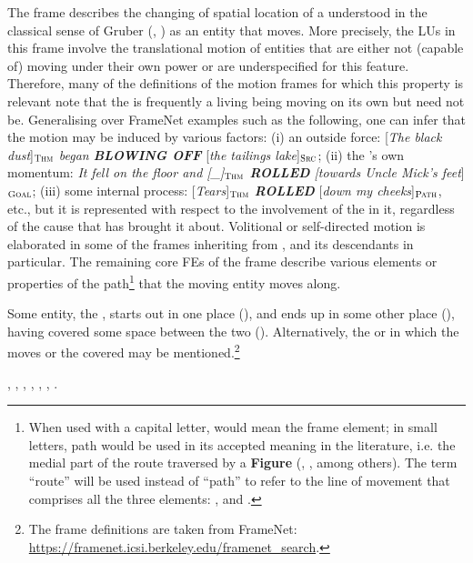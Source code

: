 \documentclass[output=paper,colorlinks,citecolor=brown]{langscibook}
\begin{document}
The  frame describes the changing of spatial location of a  understood in the classical sense of Gruber (\cite[27--31]{Gruber1965}, \cite[29]{Jackendoff1972}) as an entity that moves. More precisely, the LUs in this frame involve the translational motion of entities that are either not (capable of) moving under their own power or are underspecified for this feature. %
Therefore, many of the definitions of the motion frames for which this property is relevant note that the  is frequently a living being moving on its own but need not be. Generalising over FrameNet examples such as the following, one can infer that the motion may be induced by various factors: (i) an outside force: [\textit{The black dust}]$_{\text{\textsc{Thm}}}$ \textit{began \textbf{BLOWING OFF}} [\textit{the tailings lake}]$_{\text{\textsc{Src}}}$; %
(ii) the ’s own momentum:  \textit{It} \textit{fell on the floor and [\textit{\_}]$_{\text{\textsc{Thm}}}$ \textit{\textbf{ROLLED}} [\textit{towards Uncle Mick’s feet}}]$_{\text{\textsc{Goal}}}$; (iii) some internal process: [\textit{Tears}]$_{\text{\textsc{Thm}}}$ \textit{\textbf{ROLLED}} [\textit{down my cheeks}]$_{\text{\textsc{Path}}}$, etc., but it is represented with respect to the involvement of the  in it, regardless of the cause that has brought it about. Volitional or self-directed motion is elaborated in some of the frames inheriting from ,  and its descendants in particular. The remaining core FEs of the  frame describe various elements or properties of the path\footnote{When used with a capital letter,  would mean the frame element; in small letters, path would be used in its accepted meaning in the literature, i.e. the medial part of the route traversed by a \textbf{Figure} (\cite[26]{Fillmore1971},  \cite[275]{Lakoff1987}, among  others). The term “route” will be used instead of “path” to refer to the line of movement that comprises all the three elements: ,  and .} that the moving entity moves along. 

\begin{description}[font=\normalfont]
\item[Definition of the \framename{Motion} frame:] Some entity, the , starts out in one place (), and ends up in some other place (), having covered some space between the two (). Alternatively, the  or  in which the  moves or the  covered may be mentioned.\footnote{The frame definitions are taken from FrameNet: \url{https://framenet.icsi.berkeley.edu/framenet_search}.}

\item[Core FEs in the \framename{Motion} frame:] , , , , , , .
\end{description}
\end{document}
